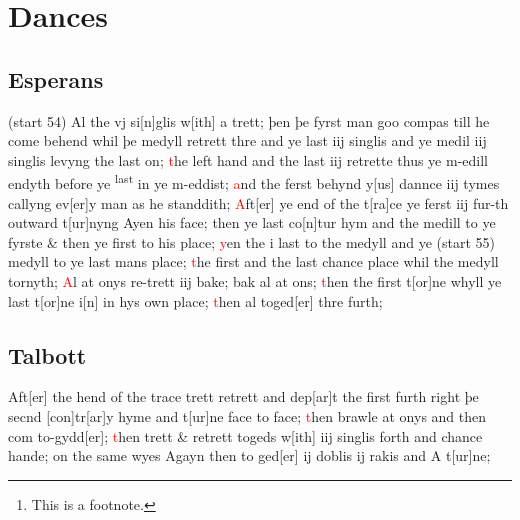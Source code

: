 \documentclass[12pt,letter]{article} %
\newcommand{\red}[1]{\textcolor{red}{#1}}
\newcommand{\srcpg}[1]{(start #1)}
\begin{document}
    \title{\rmfamily\normalfont{}}
    \author{}
    \date{} %
    
    \maketitle
    
    \begin{abstract}
        \noindent\lipsum[1] Just a test.\footnote{This is a footnote.}
    \end{abstract}
       
    \tableofcontents
\newpage

    \section{Dances}
    \reversemarginpar
    \subsection{Esperans} \raggedright 
{}\srcpg{54} Al the vj si{[}n{]}glis w{[}ith{]} a trett; þen þe 
fyrst man
goo compas till he come behend whil þe medyll retrett thre and ye last
iij singlis and ye medil iij singlis levyng the last on; \red{t}he left hand 
and the last iij retrette thus ye m-edill endyth 
before ye \textsuperscript{last} in ye m-eddist; \red{a}nd the ferst behynd 
y{[}us{]} dannce iij tymes callyng ev{[}er{]}y man as he 
standdith; \red{A}ft{[}er{]} ye
end of the t{[}ra{]}ce ye ferst iij 
fur-th outward t{[}ur{]}nyng Ayen
his face; then ye 
last co{[}n{]}tur hym and the medill to ye fyrste \& 
then ye first to his place; \red{y}en the i last to the 
medyll and ye \srcpg{55} medyll to ye last mans 
place; \red{t}he first and the last chance place
whil the 
medyll tornyth; \red{A}l at onys re-trett iij bake; bak al 
at ons; \red{t}hen the first t{[}or{]}ne whyll ye last t{[}or{]}ne 
i{[}n{]} in hys own place; \red{t}hen al toged{[}er{]} thre 
furth;

    \subsection{Talbott}
Aft{[}er{]} the hend of the trace trett retrett and 
dep{[}ar{]}t the first furth right þe secnd {[}con{]}tr{[}ar{]}y 
hyme and t{[}ur{]}ne face to face; \red{t}hen brawle at onys 
and then com to-gydd{[}er{]}; \red{t}hen trett \& retrett 
togeds w{[}ith{]} iij singlis forth and chance hande; on 
the same wyes Agayn then to ged{[}er{]} ij doblis ij 
rakis and A t{[}ur{]}ne;
\end{document}
